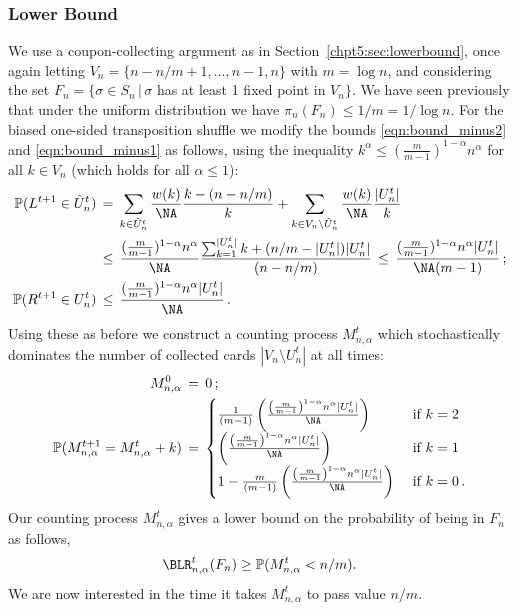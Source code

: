 \documentclass[11pt]{report}
\begin{document}
\subsubsection{Lower Bound}
We use a coupon-collecting argument as in Section~\ref{chpt5:sec:lowerbound}, once again letting $V_n = 
\{n-n/m+1,\dots,n-1,n\}$ with $m =\log n$, and considering the set $F_n = \{\sigma\in S_n \, | \, \sigma$ has at least 1 fixed point in $V_n\}$. We have seen previously that under the uniform distribution we have $\pi_{n}(F_{n}) \leq 1/m = 1/\log n$. For the biased one-sided transposition shuffle we modify the bounds \eqref{eqn:bound_minus2} and \eqref{eqn:bound_minus1} as follows, using the inequality 
$k^\alpha \le (\frac{m}{m-1})^{1-\alpha}n^\alpha$ for all $k\in V_n$ (which holds for all $\alpha\le 1$):
\begin{align}
\mathbb{P}(L^{t+1}\in \hat U_n^t) &\,=\, \sum_{k\in \hat 
	U_n^t} \frac{w(k)}{\NA}\frac{k-(n-n/m)}{k} +  \sum_{k\in 
	V_n\setminus \hat U_n^t}\frac{w(k)}{\NA}\frac{|U_n^t|}{k} \nonumber \\
&\,\le\, \frac{ (\frac{m}{m-1})^{1-\alpha}n^\alpha}{\NA}\frac{\sum_{k=1}^{|U_n^t|} k + (n/m -|U_n^t|)|U_n^t|}{(n-n/m)} 
\,\le\,\frac{(\frac{m}{m-1})^{1-\alpha}n^\alpha|U_n^t|}{\NA(m-1)}\,; \label{eqn:bound_minus2biased} \\
\mathbb{P}(R^{t+1}\in U_n^t) &\,\le\, \frac{(\frac{m}{m-1})^{1-\alpha}n^\alpha |U_n^t|}{\NA}\,. \label{eqn:bound_minus1biased}
\end{align}
Using these as before we construct a counting process $M_{n,\alpha}^t$
which stochastically dominates the number of collected cards $|V_n\setminus 
U_n^{t}|$ at all times: 
\begin{align}
M_{n,\alpha}^0 \,&=\, 0 \,; \nonumber \\
\mathbb{P}(M_{n,\alpha}^{t+1}= M_{n,\alpha}^t+k) \,&=\, 
\begin{cases} 
\frac{1}{(m-1)} \left(\frac{\left(\frac{m}{m-1}\right)^{1-\alpha} n^{\alpha} |U^{t}_{n}|}{\NA} \right) & \text{ 
	if } k=2\\
\left(\frac{\left(\frac{m}{m-1}\right)^{1-\alpha} n^{\alpha} |U^{t}_{n}|}{\NA} \right) & \text{ if } k =1\\
1- \frac{m}{(m-1)} \left(\frac{\left(\frac{m}{m-1}\right)^{1-\alpha} n^{\alpha} |U^{t}_{n}|}{\NA} \right) & 
\text{ if } k =0\,. \label{chpt5:eqn:biassmallM_change}
\end{cases}
\end{align}
Our counting process $M_{n,\alpha}^{t}$ gives a lower bound on the probability of being in $F_{n}$ as follows,
\[\BLR_{n,\alpha}^{t}(F_{n}) \geq \mathbb{P}(M_{n,\alpha}^{t} < n/m).\]
We are now interested in the time it takes $M_{n,\alpha}^{t}$ to pass value $n/m$.
\end{document}
